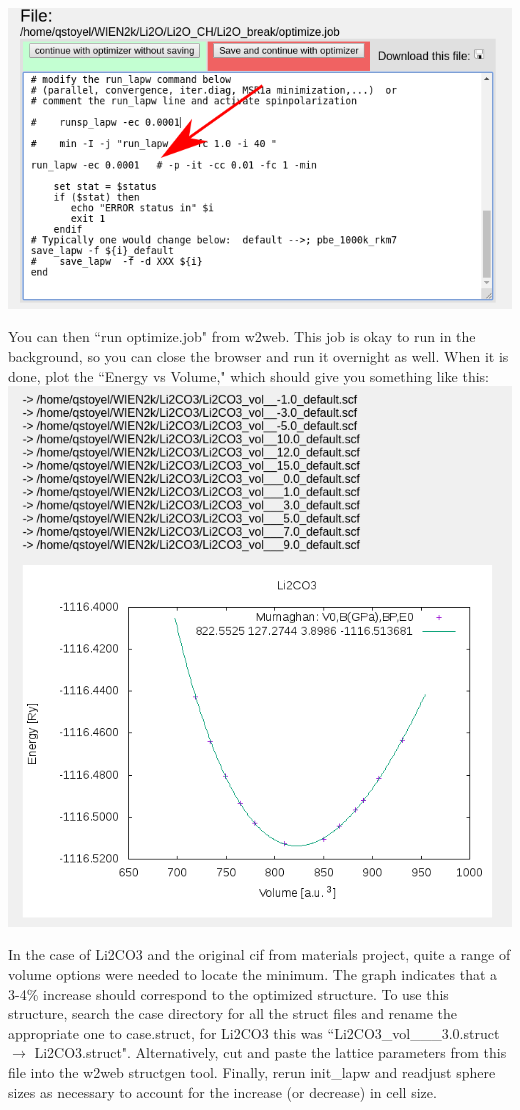 \documentclass[12pt]{article}
\begin{document}
\includegraphics[scale=0.4]{./images/vol_opt2.png}

You can then ``run optimize.job" from w2web. This job is okay to run in the background, so you can close the browser and run it overnight as well.  When it is done, plot the ``Energy vs Volume," which should give you something like this:\\
  
\includegraphics[scale=0.3]{./images/E_vs_V.png}

In the case of Li2CO3 and the original cif from materials project, quite a range of volume options were needed to locate the minimum.  The graph indicates that a 3-4\% increase should correspond to the optimized structure.  To use this structure, search the case directory for all the struct files and rename the appropriate one to case.struct, for Li2CO3 this was ``Li2CO3\_vol\_\_\_3.0.struct $\to$ Li2CO3.struct". Alternatively, cut and paste the lattice parameters from this file into the w2web structgen tool.    Finally, rerun init\_lapw and readjust sphere sizes as necessary to account for the increase (or decrease) in cell size. 
\end{document}

